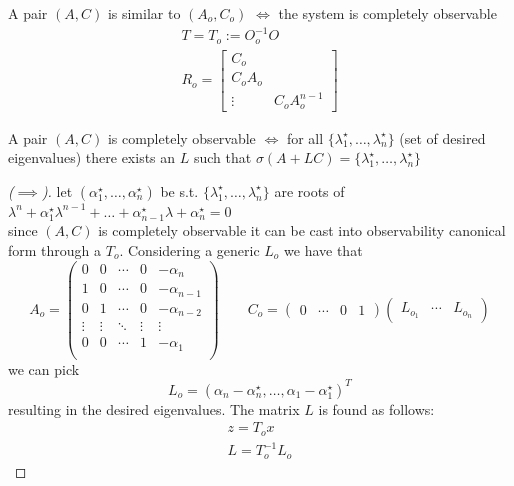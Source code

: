 \documentclass[english]{lectures}
\begin{document}
\begin{theorem}[p=1]
    A pair $(A,C)$ is similar to $(A_o,C_o)$ $\iff$ the system is completely observable
    \begin{gather*}
        T=T_o:=O_o^{-1}O\\
        R_o=\begin{bmatrix}
            C_o \\ C_oA_o \\ \vdots & C_oA_o^{n-1}
            \end{bmatrix}
    \end{gather*}

\end{theorem}


\begin{theorem}
    A pair $(A,C)$ is completely observable $\iff$ for all \(\{\lambda_1^{\star},\dots,\lambda_n^{\star}\}\) (set of desired eigenvalues) there exists an $L$ such that $\sigma(A+LC)=\{\lambda_1^{\star},\dots,\lambda_n^{\star}\}$
\end{theorem}
\begin{proof}[($\implies$)]
    let $(\alpha_1^{\star},\dots,\alpha_n^{\star})$ be s.t. $\{\lambda_1^{\star},\dots,\lambda_n^{\star}\}$ are roots of $\lambda^n+\alpha_1^{\star}\lambda^{n-1}+\dots+\alpha_{n-1}^{\star}\lambda +\alpha_n^{\star}=0$ \\
    since $(A,C)$ is completely observable it can be cast into observability canonical form through a $T_o$. Considering a generic $L_o$ we have that
    \[
        A_o=\begin{pmatrix}
            0 & 0 & \cdots & 0 & -\alpha_n \\
            1 & 0 & \cdots & 0 & -\alpha_{n-1} \\
            0 & 1 & \cdots & 0 & -\alpha_{n-2} \\
            \vdots & \vdots & \ddots & \vdots & \vdots \\
            0 & 0 & \cdots & 1 & -\alpha_1 \\
        \end{pmatrix} \qquad C_o=\begin{pmatrix}
            0 & \cdots & 0 & 1
        \end{pmatrix} \begin{pmatrix}
    L_{o_1} & \cdots & L_{o_n}
\end{pmatrix}
    \]
    we can pick
        \[
    L_o=(\alpha_n-\alpha_n^{\star},\dots,\alpha_1-\alpha_1^{\star})^T
    \]
    resulting in the desired eigenvalues. The matrix $L$ is found as follows:
    \begin{gather*}
        z=T_ox \\
        L=T_o^{-1}L_o
    \end{gather*}
    
\end{proof}
\end{document}
